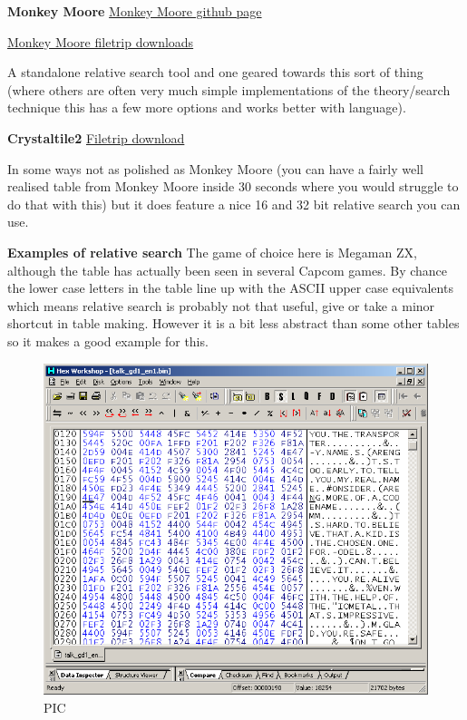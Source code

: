 \documentclass[
]{book}
\begin{document}
\textbf{Monkey Moore} \href{https://github.com/rjricken/monkey-moore}{Monkey Moore github page}

\href{http://filetrip.net/pc-downloads/applications/download-monkey-moore-05-f29133.html}{Monkey Moore filetrip downloads}

A standalone relative search tool and one geared towards this sort of thing (where others are often very much simple implementations of the theory/search technique this has a few more options and works better with language).

\textbf{Crystaltile2} \href{http://filetrip.net/f23649-CrystalTile2-2010-09-06.html}{Filetrip download}

In some ways not as polished as Monkey Moore (you can have a fairly well realised table from Monkey Moore inside 30 seconds where you would struggle to do that with this) but it does feature a nice 16 and 32 bit relative search you can use.

\textbf{Examples of relative search} The game of choice here is Megaman ZX, although the table has actually been seen in several Capcom games. By chance the lower case letters in the table line up with the ASCII upper case equivalents which means relative search is probably not that useful, give or take a minor shortcut in table making. However it is a bit less abstract than some other tables so it makes a good example for this.

\begin{figure}
\centering
\includegraphics{images/80_home_fast6191_romhackingguide_unrenamed_file___inal_borders_romhackingguiderelativesearch1.png}
\caption{PIC}
\end{figure}
\end{document}

